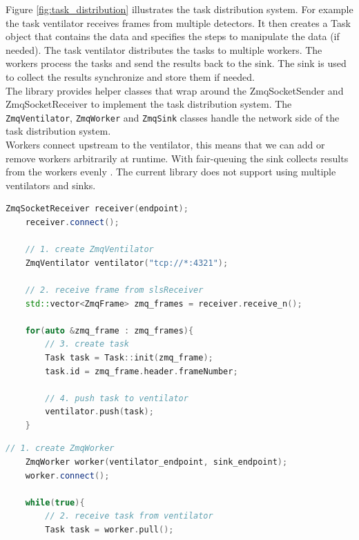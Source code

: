 \begin{spacing}{1.2}
    Figure \ref{fig:task_distribution} illustrates the task distribution system. For example the task
    ventilator receives frames from multiple detectors. It then creates a Task object that contains
    the data and specifies the steps to manipulate the data (if needed). The task ventilator
    distributes the tasks to multiple workers. The workers process the tasks and send the results
    back to the sink. The sink is used to collect the results synchronize and store them if needed.\\

    The library provides helper classes that wrap around the ZmqSocketSender and ZmqSocketReceiver
    to implement the task distribution system. The \lstinline|ZmqVentilator|, \lstinline|ZmqWorker|
    and \lstinline|ZmqSink| classes handle the network side of the task distribution system.\\

    Workers connect upstream to the ventilator, this means that we can add or
    remove workers arbitrarily at runtime. With fair-queuing the sink collects
    results from the workers evenly \cite{hintjens2013zeromq}. The current library
    does not support using multiple ventilators and sinks.\\

    \begin{lstlisting}[language=C++, caption=Example of a task ventilator, label=lst:task_ventilator]
    ZmqSocketReceiver receiver(endpoint);
    receiver.connect();

    // 1. create ZmqVentilator
    ZmqVentilator ventilator("tcp://*:4321");

    // 2. receive frame from slsReceiver
    std::vector<ZmqFrame> zmq_frames = receiver.receive_n();

    for(auto &zmq_frame : zmq_frames){
        // 3. create task
        Task task = Task::init(zmq_frame);
        task.id = zmq_frame.header.frameNumber;

        // 4. push task to ventilator
        ventilator.push(task);
    }
\end{lstlisting}

    \begin{lstlisting}[language=C++, caption=Example of a worker, label=lst:task_worker]
    // 1. create ZmqWorker
    ZmqWorker worker(ventilator_endpoint, sink_endpoint);
    worker.connect();

    while(true){
        // 2. receive task from ventilator
        Task task = worker.pull();


\end{lstlisting}
\end{spacing}

